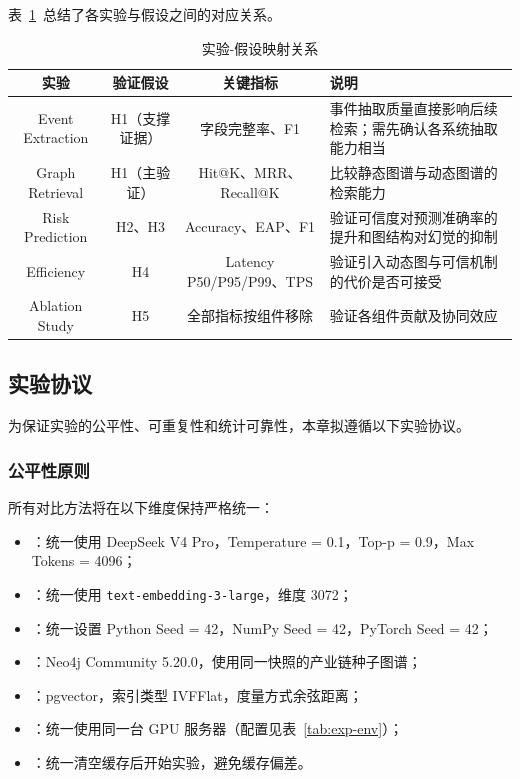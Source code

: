 表~\ref{tab:hypothesis-mapping}~总结了各实验与假设之间的对应关系。

\begin{table}[H]
\centering
\footnotesize
\caption{实验-假设映射关系}
\label{tab:hypothesis-mapping}
\begin{tabularx}{0.95\linewidth}{c c c X}
\toprule
\textbf{实验} & \textbf{验证假设} & \textbf{关键指标} & \textbf{说明} \\
\midrule
Event Extraction & H1（支撑证据） & 字段完整率、F1 & 事件抽取质量直接影响后续检索；需先确认各系统抽取能力相当 \\
Graph Retrieval & H1（主验证） & Hit@K、MRR、Recall@K & 比较静态图谱与动态图谱的检索能力 \\
Risk Prediction & H2、H3 & Accuracy、EAP、F1 & 验证可信度对预测准确率的提升和图结构对幻觉的抑制 \\
Efficiency & H4 & Latency P50/P95/P99、TPS & 验证引入动态图与可信机制的代价是否可接受 \\
Ablation Study & H5 & 全部指标按组件移除 & 验证各组件贡献及协同效应 \\
\bottomrule
\end{tabularx}
\end{table}

\subsection{实验协议}
\label{sec:exp-protocol}

为保证实验的公平性、可重复性和统计可靠性，本章拟遵循以下实验协议。

\subsubsection{公平性原则}

所有对比方法将在以下维度保持严格统一：
\begin{itemize}
    \item {}：统一使用 DeepSeek V4 Pro，Temperature = 0.1，Top-p = 0.9，Max Tokens = 4096；
    \item {}：统一使用 \texttt{text-embedding-3-large}，维度 3072；
    \item {}：统一设置 Python Seed = 42，NumPy Seed = 42，PyTorch Seed = 42；
    \item {}：Neo4j Community 5.20.0，使用同一快照的产业链种子图谱；
    \item {}：pgvector，索引类型 IVFFlat，度量方式余弦距离；
    \item {}：统一使用同一台 GPU 服务器（配置见表~\ref{tab:exp-env}）；
    \item {}：统一清空缓存后开始实验，避免缓存偏差。
\end{itemize}

